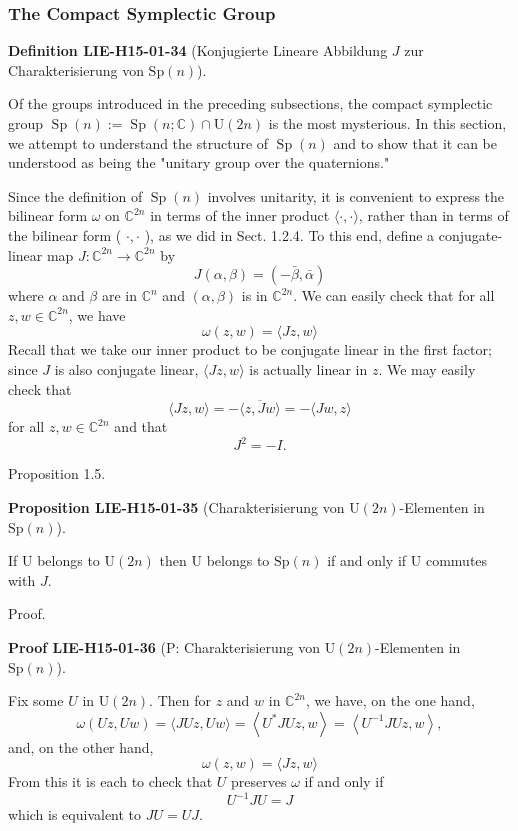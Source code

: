 \documentclass[10pt, letterpaper]{article}
\newcommand{\Sp}{\mathrm{Sp}}
\newcommand{\U}{\mathrm{U}}
\newcommand{\CustomHeading}[3]{%
  \par\medskip\noindent%
  \textbf{#1 #2} \textnormal{(#3)}.\enskip%
}
\newenvironment{DEF}[2]{\begin{unitbox}\CustomHeading{Definition}{#1}{#2}}{\end{unitbox}}
\newenvironment{PROP}[2]{\begin{unitbox}\CustomHeading{Proposition}{#1}{#2}}{\end{unitbox}}
\newenvironment{PROOF}[2]{\begin{unitbox}\CustomHeading{Proof}{#1}{#2}}{\end{unitbox}}
\begin{document}
\subsubsection*{The Compact Symplectic Group}


\begin{DEF}{LIE-H15-01-34}{Konjugierte Lineare Abbildung $J$ zur Charakterisierung von $\Sp(n)$}
Of the groups introduced in the preceding subsections, the compact symplectic group $\operatorname{Sp}(n):=\operatorname{Sp}(n ; \mathbb{C}) \cap \mathrm{U}(2 n)$ is the most mysterious. In this section, we attempt to understand the structure of $\operatorname{Sp}(n)$ and to show that it can be understood as being the "unitary group over the quaternions."

Since the definition of $\operatorname{Sp}(n)$ involves unitarity, it is convenient to express the bilinear form $\omega$ on $\mathbb{C}^{2 n}$ in terms of the inner product $\langle\cdot, \cdot\rangle$, rather than in terms of the bilinear form ( $\cdot, \cdot$ ), as we did in Sect. 1.2.4. To this end, define a conjugate-linear map $J: \mathbb{C}^{2 n} \rightarrow \mathbb{C}^{2 n}$ by
$$
J(\alpha, \beta)=(-\bar{\beta}, \bar{\alpha})
$$
where $\alpha$ and $\beta$ are in $\mathbb{C}^{n}$ and $(\alpha, \beta)$ is in $\mathbb{C}^{2 n}$. We can easily check that for all $z, w \in \mathbb{C}^{2 n}$, we have
$$
\omega(z, w)=\langle J z, w\rangle
$$
Recall that we take our inner product to be conjugate linear in the first factor; since $J$ is also conjugate linear, $\langle J z, w\rangle$ is actually linear in $z$. We may easily check that
$$
\langle J z, w\rangle=-\overline{\langle z, J w\rangle}=-\langle J w, z\rangle
$$
for all $z, w \in \mathbb{C}^{2 n}$ and that
$$
J^{2}=-I .
$$
\end{DEF}



Proposition 1.5. 

\begin{PROP}{LIE-H15-01-35}{Charakterisierung von $\U(2n)$-Elementen in $\Sp(n)$}
If $\U$ belongs to $\U(2n)$ then $\U$ belongs to $\Sp(n)$ if and only if $\U$ commutes with $J$.
\end{PROP}

Proof. 

\begin{PROOF}{LIE-H15-01-36}{P: Charakterisierung von $\U(2n)$-Elementen in $\Sp(n)$}
Fix some $U$ in $\mathrm{U}(2 n)$. Then for $z$ and $w$ in $\mathbb{C}^{2 n}$, we have, on the one hand,
$$
\omega(U z, U w)=\langle J U z, U w\rangle=\left\langle U^{*} J U z, w\right\rangle=\left\langle U^{-1} J U z, w\right\rangle,
$$
and, on the other hand,
$$
\omega(z, w)=\langle J z, w\rangle
$$
From this it is each to check that $U$ preserves $\omega$ if and only if
$$
U^{-1} J U=J
$$
which is equivalent to $J U=U J$.
\end{PROOF}
\end{document}
